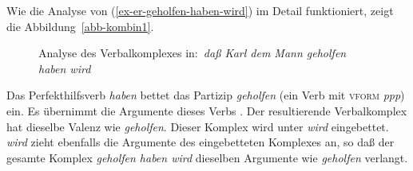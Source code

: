 Wie die Analyse von (\ref{ex-er-geholfen-haben-wird}) im Detail funktioniert, zeigt die Abbildung~\vref{abb-kombin1}.
\begin{figure}[htb]
\caption{Analyse des Verbalkomplexes in:\ \emph{daß Karl dem Mann geholfen haben wird}}\label{abb-kombin1}%
\end{figure}
Das Perfekthilfsverb \emph{haben} bettet das Partizip \emph{geholfen} (ein Verb mit \textsc{vform} \textit{ppp\/})
ein. Es übernimmt die Argumente dieses Verbs . Der resultierende Verbalkomplex hat dieselbe
Valenz wie \emph{geholfen}. Dieser Komplex wird unter \emph{wird} eingebettet. \emph{wird} zieht
ebenfalls die Argumente des eingebetteten Komplexes an, so daß der gesamte Komplex \emph{geholfen haben wird}
dieselben Argumente wie \emph{geholfen} verlangt.

